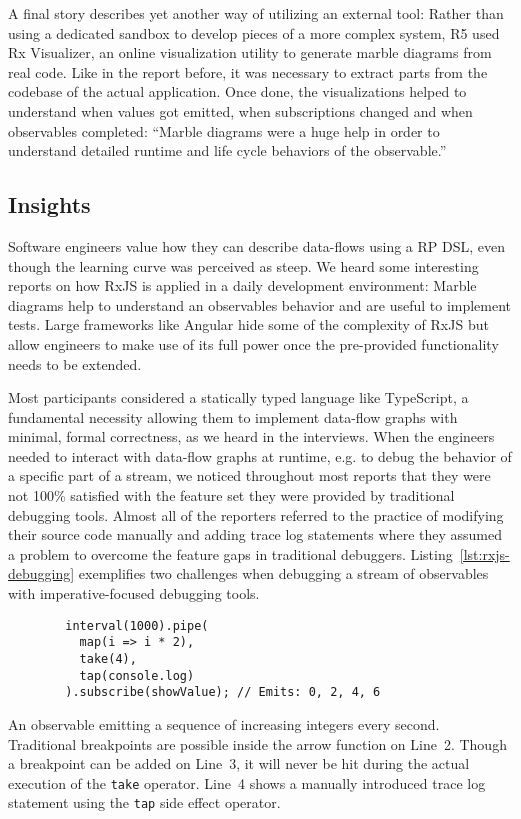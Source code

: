 \documentclass[sigplan,screen]{acmart}
\begin{document}
A final story describes yet another way of utilizing an external tool: Rather than using a dedicated sandbox to develop pieces of a more complex system, R5 used Rx Visualizer, an online visualization utility to generate marble diagrams from real code. Like in the report before, it was necessary to extract parts from the codebase of the actual application. Once done, the visualizations helped to understand when values got emitted, when subscriptions changed and when observables completed: ``Marble diagrams were a huge help in order to understand detailed runtime and life cycle behaviors of the observable.''

\subsection{Insights}

Software engineers value how they can describe data-flows using a RP DSL, even though the learning curve was perceived as steep. We heard some interesting reports on how RxJS is applied in a daily development environment: Marble diagrams help to understand  an observables behavior and are useful to implement tests. Large frameworks like Angular hide some of the complexity of RxJS but allow engineers to make use of its full power once the pre-provided functionality needs to be extended.

Most participants considered a statically typed language like TypeScript, a fundamental necessity allowing them to implement data-flow graphs with minimal, formal correctness, as we heard in the interviews. When the engineers needed to interact with data-flow graphs at runtime, e.g. to debug the behavior of a specific part of a stream, we noticed throughout most reports that they were not 100\% satisfied with the feature set they were provided by traditional debugging tools. Almost all of the reporters referred to the practice of modifying their source code manually and adding trace log statements where they assumed a problem to overcome the feature gaps in traditional debuggers. Listing~\ref{lst:rxjs-debugging} exemplifies two challenges when debugging a stream of observables with imperative-focused debugging tools.

\begin{listing}
	\begin{verbatim}
		interval(1000).pipe(
		  map(i => i * 2),
		  take(4),
		  tap(console.log)
		).subscribe(showValue); // Emits: 0, 2, 4, 6
	\end{verbatim}
	\caption{An observable emitting a sequence of increasing integers every second. Traditional breakpoints are possible inside the arrow function on Line~2. Though a breakpoint can be added on Line~3, it will never be hit during the actual execution of the \texttt{take} operator. Line~4 shows a manually introduced trace log statement using the \texttt{tap} side effect operator.}
	\label{lst:rxjs-debugging}
\end{listing}
\end{document}
